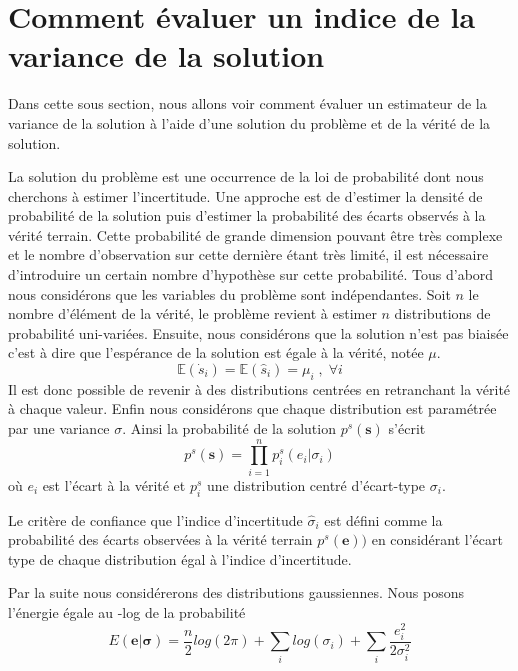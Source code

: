 \documentclass[../main/These_Mathias_Paget.tex]{subfiles}
\begin{document}
\section{Comment évaluer un indice de la variance de la solution}
\label{s:eval_indice}

Dans cette sous section, nous allons voir comment évaluer un estimateur de la variance de la solution à l'aide d'une solution du problème et de la vérité de la solution.

La solution du problème est une occurrence de la loi de probabilité dont nous cherchons à estimer l'incertitude. Une approche est de d'estimer la densité de probabilité de la solution puis d'estimer la probabilité des écarts observés à la vérité terrain. Cette probabilité de grande dimension pouvant être très complexe et le nombre d'observation sur cette dernière étant très limité, il est nécessaire d'introduire un certain nombre d'hypothèse sur cette probabilité. Tous d'abord nous considérons que les variables du problème sont indépendantes. Soit $n$ le nombre d’élément de la vérité, le problème revient à estimer $n$ distributions de probabilité uni-variées. Ensuite, nous considérons que la solution n'est pas biaisée c'est à dire que l'espérance de la solution est égale à la vérité, notée $\mu$. 
\begin{equation}
  \mathbb{E}(\dot{s}_i) = \mathbb{E}(\hat{s}_i) =  \mu_i   \; , \;  \forall i
\end{equation}
Il est donc possible de revenir à des distributions centrées en retranchant la vérité à chaque valeur. Enfin nous considérons que chaque distribution est paramétrée par une variance $\sigma$. Ainsi la probabilité de la solution $p^s(\boldsymbol{s})$ s'écrit
\begin{equation}
p^s(\boldsymbol{s}) = \prod_{i=1}^{n}{p^s_i(e_i|\sigma_i)}
\end{equation}
où $e_i$ est l'écart à la vérité et $p^s_i$ une distribution centré d'écart-type $\sigma_i$.

Le critère de confiance que l'indice d'incertitude $\hat{\sigma}_i$ est défini comme la probabilité des écarts observées à la vérité terrain $p^s(\boldsymbol{e}))$ en considérant l'écart type de chaque distribution égal à l'indice d'incertitude.

Par la suite nous considérerons des distributions gaussiennes. Nous posons l’énergie égale au -log de la probabilité
\begin{equation}
E(\boldsymbol{e}|\boldsymbol{\sigma}) = \frac{n}{2}log(2\pi)  + \sum_i{log(\sigma_i)} + \sum_i\frac{e_i^2}{2 \sigma_i^2}
\end{equation}
\end{document}
